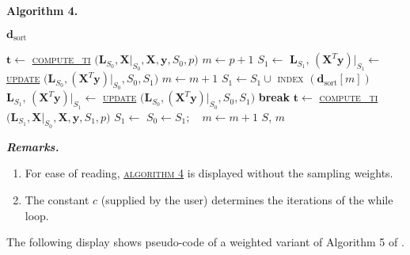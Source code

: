 \documentclass[a4paper,oneside,11pt,DIV=12]{scrartcl}
\begin{document}
\vspace{1em}
\noindent \textbf{\sffamily Algorithm 4.}
\begin{algorithmic}[1]
	\hypertarget{alg:alg4}{\Require $\bm d_{\mathrm{sort}}$}
	\State $\bm t \gets$ \hyperlink{alg:computeti}{\textsc{compute\_ti}}
		$\big( \bm L_{S_0}, \bm X\vert_{S_0}, \bm X, \bm y, S_0, p\big)$
	\State $m \gets p + 1$
	\State $S_1 \gets$ 
		\State $\bm L_{S_1}, \, (\bm X^T  \bm y)\vert_{S_1} \gets$
			\hyperlink{alg:update}{\textsc{update}}
			$\big(\bm L_{S_0}, (\bm X^T \bm y)\vert_{S_0}, S_0, S_1\big)$
				\State $m \gets m + 1$
				\State $S_1 \gets S_1 \cup$ \textsc{index}
					$(\bm d_{\mathrm{sort}}[m])$
				\State $\bm L_{S_1}, \, (\bm X^T  \bm y)\vert_{S_1} \gets$
					\hyperlink{alg:update}{\textsc{update}}
					$\big(\bm L_{S_0}, (\bm X^T \bm y)\vert_{S_0}, S_0, S_1\big)$
					\State \textbf{break}
				\EndIf
			\EndWhile
		\EndIf
		\State $\bm t \gets$ \hyperlink{alg:computeti}{\textsc{compute\_ti}}
			$\big(\bm L_{S_1}, \bm X\vert_{S_0}, \bm X, \bm y, S_1, p\big)$
		\State $S_1 \gets$ 
		\State $S_0 \gets S_1; \quad m \gets m + 1$
		\EndWhile
		\State \Return $S$, $m$
\end{algorithmic}

\vspace{1em}
\noindent\textbf{\sffamily \small \itshape Remarks.}
\vspace{-0.5em}
\begin{enumerate}[1)]
	\item For ease of reading, \hyperlink{alg:alg4}{\textsc{algorithm} 4} is
		displayed without the sampling weights.
	\item The constant $c$ (supplied by the user) determines the iterations
		of the while loop.
\end{enumerate}

\noindent The following display shows pseudo-code of a weighted variant of
Algorithm 5 of \citet{billor_hadi_etal_2000}.
\end{document}
